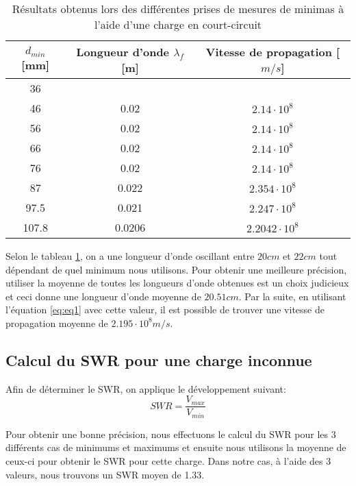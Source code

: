 \begin{table}[htbp]
    \centering
    \begin{tabular}{|c||c|c|} \hline
        $d_{min}$ [mm] & Longueur d'onde $\lambda_f$ [m] & Vitesse de propagation [$m/s$]\\ \hline \hline
        36 &  & \\ 
        46 & 0.02 & $2.14\cdot 10^8$\\ 
        56 & 0.02 & $2.14\cdot 10^8$\\ 
        66 & 0.02 & $2.14\cdot 10^8$\\ 
        76 & 0.02 & $2.14\cdot 10^8$\\ 
        87 & 0.022 & $2.354\cdot 10^8$\\ 
        97.5 & 0.021 & $2.247\cdot 10^8$\\ 
        107.8 & 0.0206 & $2.2042\cdot 10^8$\\ \hline
    \end{tabular}%
        \caption{Résultats obtenus lors des différentes prises de mesures de minimas à l'aide d'une charge en court-circuit}
    \label{tab:tabnum2.1}%
\end{table}%
Selon le tableau \ref{tab:tabnum2.1}, on a une longueur d'onde oscillant entre $20cm$ et $22cm$ tout dépendant de quel minimum nous utilisons. Pour obtenir une meilleure précision, utiliser la moyenne de toutes les longueurs d'onde obtenues est un choix judicieux et ceci donne une longueur d'onde moyenne de $20.51cm$. Par la suite, en utilisant l'équation \ref{eq:eq1} avec cette valeur, il est possible de trouver une vitesse de propagation moyenne de $2.195 \cdot 10^8 m/s$.

\subsection{Calcul du SWR pour une charge inconnue}
Afin de déterminer le SWR, on applique le développement suivant:
\begin{equation}
\label{eq:3}
SWR = \frac{V_{max}}{V_{min}}
\end{equation}

Pour obtenir une bonne précision, nous effectuons le calcul du SWR pour les 3 différents cas de minimums et maximums et ensuite nous utilisons la moyenne de ceux-ci pour obtenir le SWR pour cette charge. Dans notre cas, à l'aide des 3 valeurs, nous trouvons un SWR moyen de 1.33.

